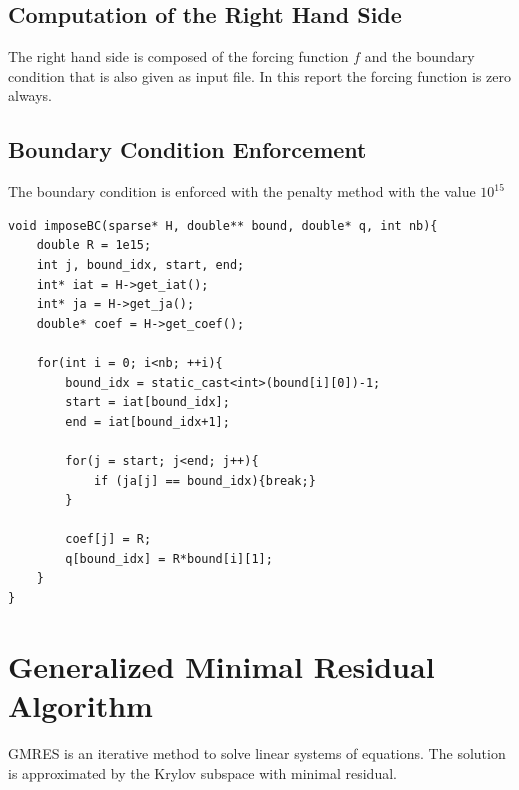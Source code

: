 \documentclass{article}
\begin{document}
\subsection{Computation of the Right Hand Side}
The right hand side is composed of the forcing function $f$ and the boundary condition that is also given as input file. In this report the forcing function is zero always.
\subsection{Boundary Condition Enforcement}
The boundary condition is enforced with the penalty method with the value $10^{15}$
\begin{verbatim}
void imposeBC(sparse* H, double** bound, double* q, int nb){
	double R = 1e15;
	int j, bound_idx, start, end;
	int* iat = H->get_iat();
	int* ja = H->get_ja();
	double* coef = H->get_coef();
	
	for(int i = 0; i<nb; ++i){
		bound_idx = static_cast<int>(bound[i][0])-1;
		start = iat[bound_idx];
		end = iat[bound_idx+1];
		
		for(j = start; j<end; j++){
			if (ja[j] == bound_idx){break;}
		}
		
		coef[j] = R;
		q[bound_idx] = R*bound[i][1];
	}
}
\end{verbatim}
\section{Generalized Minimal Residual Algorithm}
GMRES is an iterative method to solve linear systems of equations. The solution is approximated by the Krylov subspace with minimal residual.
\end{document}
